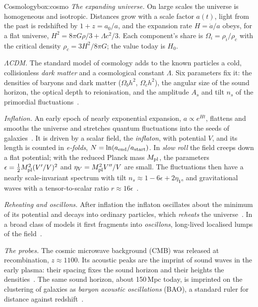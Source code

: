 \begin{primer}{Cosmology}{box:cosmo}
\setlength{\parskip}{3pt plus 1pt}%
\emph{The expanding universe.} On large scales the universe is homogeneous and isotropic. Distances grow with a scale factor $a(t)$, light
from the past is redshifted by $1+z=a_0/a$, and the expansion rate $H=\dot a/a$ obeys, for a flat universe,
$H^2=8\pi G\rho/3+\Lambda c^2/3$. Each component's share is $\Omega_i=\rho_i/\rho_c$ with the critical density $\rho_c=3H^2/8\pi G$; the
value today is $H_0$.

\emph{$\Lambda$CDM.} The standard model of cosmology adds to the known particles a cold, collisionless \emph{dark matter} and a
cosmological constant $\Lambda$. Six parameters fix it: the densities of baryons and dark matter ($\Omega_bh^2$, $\Omega_ch^2$), the angular
size of the sound horizon, the optical depth to reionisation, and the amplitude $A_s$ and tilt $n_s$ of the primordial
fluctuations~\cite{planck18}.

\emph{Inflation.} An early epoch of nearly exponential expansion, $a\propto e^{Ht}$, flattens and smooths the universe and stretches
quantum fluctuations into the seeds of galaxies~\cite{guth}. It is driven by a scalar field, the \emph{inflaton}, with potential $V$, and
its length is counted in \emph{e-folds}, $N=\ln(a_{\rm end}/a_{\rm start})$. In \emph{slow roll} the field creeps down a flat potential;
with the reduced Planck mass $M_{\rm pl}$, the parameters $\epsilon=\tfrac12M_{\rm pl}^2(V'/V)^2$ and $\eta_V=M_{\rm pl}^2V''/V$ are small. The
fluctuations then have a nearly scale-invariant spectrum with tilt $n_s\approx1-6\epsilon+2\eta_V$, and gravitational waves with a
tensor-to-scalar ratio $r\approx16\epsilon$~\cite{planck2020x}.

\emph{Reheating and oscillons.} After inflation the inflaton oscillates about the minimum of its potential and decays into ordinary
particles, which \emph{reheats} the universe~\cite{kls}. In a broad class of models it first fragments into \emph{oscillons}, long-lived
localised lumps of the field~\cite{amin}.

\emph{The probes.} The cosmic microwave background (CMB) was released at recombination, $z\approx1100$. Its acoustic peaks are the imprint of
sound waves in the early plasma: their spacing fixes the sound horizon and their heights the densities~\cite{planck18}. The same sound
horizon, about 150\,Mpc today, is imprinted on the clustering of galaxies as \emph{baryon acoustic oscillations} (BAO), a standard ruler
for distance against redshift~\cite{desi2}.


\end{primer}
